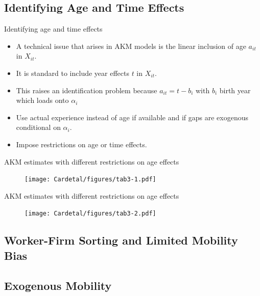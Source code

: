 \documentclass[notes=show]{beamer}
\begin{document}
\subsection*{Identifying Age and Time Effects}

\begin{frame}{Identifying age and time effects}
\begin{itemize}
\item A technical issue that arises in AKM models is the linear inclusion of age $a_{it}$ in $X_{it}$. \medskip
\item It is standard to include year effects $t$ in $X_{it}$. \medskip
\item This raises an identification problem because $a_{it} = t - b_{i}$ with $b_{i}$ birth year which loads onto $\alpha_{i}$ \medskip
\item Use actual experience instead of age if available and if gaps are exogenous conditional on $\alpha_{i}$. \medskip
\item Impose restrictions on age or time effects. 
\end{itemize}
\end{frame}

\newpage
\begin{frame}{AKM estimates with different restrictions on age effects}
\begin{center}
\begin{figure}
\texttt{[image: Cardetal/figures/tab3-1.pdf]}
\end{figure} 
\end{center}
\end{frame}

\newpage
\begin{frame}{AKM estimates with different restrictions on age effects}
\begin{center}
\begin{figure}
\texttt{[image: Cardetal/figures/tab3-2.pdf]}
\end{figure} 
\end{center}
\end{frame}

\subsection*{Worker-Firm Sorting and Limited Mobility Bias}

\subsection*{Exogenous Mobility}
\end{document}
